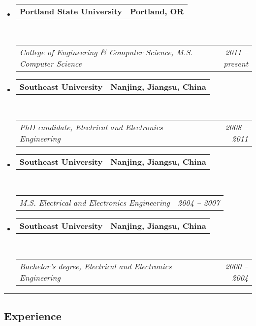 \documentclass[10pt,letterpaper]{article}
\makeatletter
\newcommand{\headerrow}[2]
{\begin{tabular*}{\linewidth}{l@{\extracolsep{\fill}}r}
	#1 &
	#2 \\
\end{tabular*}}
\makeatother
\begin{document}
\begin{itemize}
	\parskip=0.1em

	\item 
	\headerrow
		{\textbf{Portland State University}}
		{\textbf{Portland, OR}}
	\\
	\headerrow
		{\emph{College of Engineering \& Computer Science, M.S. Computer Science}}
		{\emph{2011 -- present}}

	\item 
	\headerrow
		{\textbf{Southeast University}}
		{\textbf{Nanjing, Jiangsu, China}}
	\\
	\headerrow
		{\emph{PhD candidate, Electrical and Electronics Engineering}}
		{\emph{2008 -- 2011}}

	\item 
	\headerrow
		{\textbf{Southeast University}}
		{\textbf{Nanjing, Jiangsu, China}}
	\\
	\headerrow
		{\emph{M.S. Electrical and Electronics Engineering}}
		{\emph{2004 -- 2007}}

	\item 
	\headerrow
		{\textbf{Southeast University}}
		{\textbf{Nanjing, Jiangsu, China}}
	\\
	\headerrow
		{\emph{Bachelor's degree, Electrical and Electronics Engineering}}
		{\emph{2000 -- 2004}}

\end{itemize}


\hrule
\vspace{-0.4em}
\subsection*{Experience}
\end{document}
